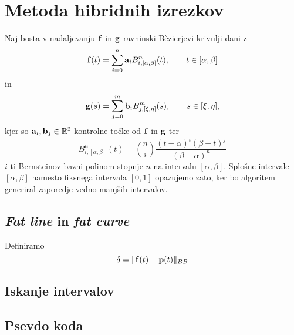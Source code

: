 \documentclass[12pt,a4paper, reqno]{amsart}
\newtheorem{definicija}{Definicija}[section]
\newtheorem{izrek}[definicija]{Izrek}
\def\R{\mathbb R}
\begin{document}
\section{Metoda hibridnih izrezkov}
Naj bosta v nadaljevanju ${\bf f}$ in ${\bf g}$ ravninski B\`{e}zierjevi krivulji dani z 
$${\bf f}(t) = \sum _{i=0}^{n} {\bf a}_i B_{i,[\alpha,\beta]}^n(t), \qquad t\in[\alpha,\beta]$$
in
$${\bf g}(s) = \sum _{j=0}^{m} {\bf b}_i B_{j,[\xi,\eta]}^m(s), \qquad s\in[\xi,\eta],$$
kjer so ${\bf a}_i, {\bf b}_j \in \R ^2$ kontrolne točke od ${\bf f}$ in ${\bf g}$ ter 
$$
B_{i,[\alpha,\beta]}^n(t) = \binom{n}{i} \frac{(t-\alpha)^i(\beta - t)^j}{(\beta - \alpha)^n}
$$
$i$-ti Bernsteinov bazni polinom stopnje $n$ na intervalu $[\alpha,\beta]$. Splošne intervale $[\alpha,\beta]$ namesto fiksnega intervala $[0,1]$ opazujemo zato, ker bo algoritem generiral zaporedje vedno manjših intervalov.

\subsection{{\em Fat line} in {\em fat curve}}

Definiramo
\begin{equation}\label{def_delta}
\delta = \lVert {\bf f}(t) - {\bf p}(t) \rVert _{BB}
\end{equation}



\subsection{Iskanje intervalov}

\subsection{Psevdo koda}
\end{document}
